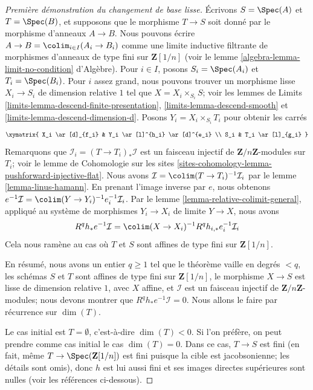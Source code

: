 \begin{proof}[Première démonstration du changement de base lisse]
\medskip\noindent
Écrivons $S = \Spec(A)$ et $T = \Spec(B)$, et supposons que le morphisme
$T \to S$ soit donné par le morphisme d'anneaux $A \to B$. Nous pouvons écrire
$A \to B = \colim_{i \in I} (A_i \to B_i)$ comme une limite inductive
filtrante de morphismes d'anneaux de type fini sur $\mathbf{Z}[1/n]$
(voir le lemme \ref{algebra-lemma-limit-no-condition} d'Algèbre).
Pour $i \in I$, posons $S_i = \Spec(A_i)$ et $T_i = \Spec(B_i)$.
Pour $i$ assez grand, nous pouvons trouver un morphisme lisse $X_i \to S_i$
de dimension relative $1$ tel que $X = X_i \times_{S_i} S$; voir les
lemmes de Limits \ref{limits-lemma-descend-finite-presentation},
\ref{limits-lemma-descend-smooth} et
\ref{limits-lemma-descend-dimension-d}. Posons $Y_i = X_i \times_{S_i} T_i$
pour obtenir les carrés
$$
\xymatrix{
X_i \ar[d]_{f_i} & Y_i \ar[l]^{h_i} \ar[d]^{e_i} \\
S_i & T_i \ar[l]_{g_i}
}
$$
Remarquons que $\mathcal{I}_i = (T \to T_i)_*\mathcal{I}$
est un faisceau injectif de $\mathbf{Z}/n\mathbf{Z}$-modules sur
$T_i$; voir le lemme de Cohomologie sur les sites
\ref{sites-cohomology-lemma-pushforward-injective-flat}.
Nous avons $\mathcal{I} = \colim (T \to T_i)^{-1}\mathcal{I}_i$
par le lemme \ref{lemma-linus-hamann}. En prenant l'image inverse par $e$, nous obtenons
$e^{-1}\mathcal{I} = \colim (Y \to Y_i)^{-1}e_i^{-1}\mathcal{I}_i$.
Par le lemme \ref{lemma-relative-colimit-general}, appliqué au système
de morphismes $Y_i \to X_i$ de limite $Y \to X$, nous avons
$$
R^qh_*e^{-1}\mathcal{I} =
\colim (X \to X_i)^{-1} R^qh_{i, *} e_i^{-1}\mathcal{I}_i
$$
Cela nous ramène au cas où $T$ et $S$ sont affines de type
fini sur $\mathbf{Z}[1/n]$.

\medskip\noindent
En résumé, nous avons un entier $q \geq 1$ tel que le théorème vaille
en degrés $< q$, les schémas $S$ et $T$ sont affines de type fini
sur $\mathbf{Z}[1/n]$, le morphisme
$X \to S$ est lisse de dimension relative $1$, avec $X$ affine, et
$\mathcal{I}$ est un faisceau injectif de $\mathbf{Z}/n\mathbf{Z}$-modules;
nous devons montrer que $R^qh_*e^{-1}\mathcal{I} = 0$.
Nous allons le faire par récurrence sur $\dim(T)$.

\medskip\noindent
Le cas initial est $T = \emptyset$, c'est-à-dire $\dim(T) < 0$.
Si l'on préfère, on peut prendre comme cas initial
le cas $\dim(T) = 0$. Dans ce cas, $T \to S$ est fini
(en fait, même $T \to \Spec(\mathbf{Z}[1/n])$ est fini puisque la
cible est jacobsonienne; les détails sont omis), donc
$h$ est lui aussi fini et ses
images directes supérieures sont nulles (voir les références ci-dessous).


\end{proof}
